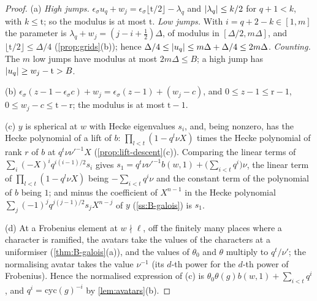 \begin{proof}
(a) \emph{High jumps.} $\epsilon_\sigma u_q+w_j=\epsilon_\sigma\lfloor\mathrm t/2\rfloor-\lambda_q$ and $\lvert \lambda_q\rvert\le k/2$ for $q+1<k$, with $k\le\mathrm t$; so the modulus is at most $\mathrm t$. \emph{Low jumps.} With $i=q+2-k\in[1,m]$ the parameter is
$\lambda_q+w_j=(j-i+\frac12)\Delta$, of modulus in $[\Delta/2,m\Delta]$, and $\lfloor\mathrm t/2\rfloor\le\Delta/4$ (\cref{prop:grids}(b)); hence $\Delta/4\le\lvert u_q\rvert\le m\Delta+\Delta/4\le2m\Delta$. \emph{Counting.} The $m$ low jumps have modulus at most $2m\Delta\le B$; a high
jump has $\lvert u_q\rvert\ge w_j-\mathrm t>B$.

(b) $\epsilon_\sigma(z-1-\epsilon_\sigma c)+w_j=\epsilon_\sigma(z-1)+(w_j-c)$, and $0\le z-1\le\mathrm r-1$, $0\le w_j-c\le\mathrm t-\mathrm r$; the modulus is at most $\mathrm t-1$.

(c) $y$ is spherical at $w$ with Hecke eigenvalues $s_i$, and, being nonzero, has the Hecke polynomial of a lift of $b$: $\prod_{l<t}(1-q^l\nu X)$ times the Hecke polynomial of rank $r$ of $b$ at $q^t\nu\nu'^{-1}X$
(\cref{prop:lift-descent}(c)). Comparing the linear terms of $\sum_i(-X)^iq^{i(i-1)/2}s_i$ gives $s_1=q^t\nu\nu'^{-1}b(w,1)+\bigl(\sum_{i<t}q^i\bigr)\nu$, the linear term of $\prod_{l<t}(1-q^l\nu X)$ being $-\sum_{i<t}q^i\nu$ and the
constant term of the polynomial of $b$ being $1$; and minus the coefficient of $X^{n-1}$ in the Hecke polynomial $\sum_j(-1)^jq^{j(j-1)/2}s_jX^{n-j}$ of $y$ (\cref{ss:B-galois}) is $s_1$.

(d) At a Frobenius element at $w\nmid\ell$, off the finitely many places where a character is ramified, the avatars take the values of the characters at a uniformiser (\cref{thm:B-galois}(a)), and the values of $\theta_0$ and $\theta$
multiply to $q^t/\nu'$; the normalising avatar takes the value $\nu^{-1}$ (its $d$-th power for the $d$-th power of Frobenius). Hence the normalised expression of (c) is $\theta_0\theta(g)b(w,1)+\sum_{i<t}q^i$, and $q^i=\mathrm{cyc}(g)^{-i}$
by \cref{lem:avatars}(b).
\end{proof}


